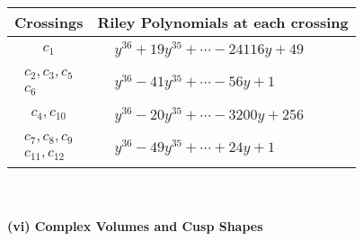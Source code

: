 \documentclass[1p]{elsarticle_modified}
\theoremstyle{definition}
\begin{document}
\begin{tabular}{m{50pt}|m{274pt}}
Crossings & \hspace{64pt}Riley Polynomials at each crossing \\
\hline $$\begin{aligned}c_{1}\end{aligned}$$&$\begin{aligned}
&y^{36}+19 y^{35}+\cdots-24116 y+49
\end{aligned}$\\
\hline $$\begin{aligned}c_{2},c_{3},c_{5}\\c_{6}\end{aligned}$$&$\begin{aligned}
&y^{36}-41 y^{35}+\cdots-56 y+1
\end{aligned}$\\
\hline $$\begin{aligned}c_{4},c_{10}\end{aligned}$$&$\begin{aligned}
&y^{36}-20 y^{35}+\cdots-3200 y+256
\end{aligned}$\\
\hline $$\begin{aligned}c_{7},c_{8},c_{9}\\c_{11},c_{12}\end{aligned}$$&$\begin{aligned}
&y^{36}-49 y^{35}+\cdots+24 y+1
\end{aligned}$\\
\hline
\end{tabular}\\~\\
\newpage\flushleft \textbf{(vi) Complex Volumes and Cusp Shapes}
\end{document}
